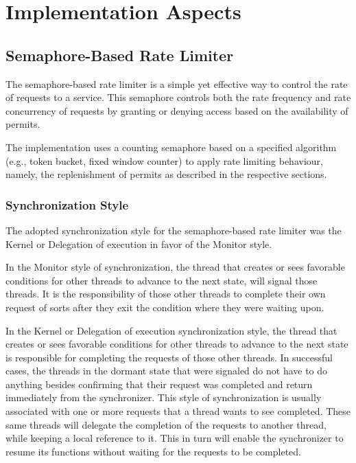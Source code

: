 \section{Implementation Aspects}\label{sec:rate-limiter-implementation}

\subsection{Semaphore-Based Rate Limiter}\label{subsec:rate-limiter-semaphore-based}

The semaphore-based rate limiter is a simple yet effective way to control the rate of requests to a service.
This semaphore controls both the rate frequency and rate concurrency of requests by granting or denying access based on the availability of permits.

The implementation uses a counting semaphore based on a specified algorithm
(e.g., token bucket, fixed window counter) to apply rate limiting behaviour, namely,
the replenishment of permits as described in the respective sections.

\subsubsection{Synchronization Style}\label{subsubsec:rate-limiter-synchronization-style}

The adopted synchronization style for the semaphore-based rate limiter was the Kernel or Delegation of execution in favor of the Monitor style.

In the Monitor style of synchronization, the thread that creates or sees favorable conditions for other threads to advance to the next state, will signal those threads. It is the responsibility of those other threads to complete their own request of sorts after they exit the condition where they were waiting upon.

In the Kernel or Delegation of execution synchronization style,
the thread that creates or sees favorable conditions for other threads to advance to the next state is responsible
for completing the requests of those other threads.
In successful cases,
the threads in the dormant state that were signaled do not have
to do anything besides confirming that their request was completed and return immediately from the synchronizer.
This style of synchronization is usually associated with one or more requests that a thread wants to see completed.
These same threads will delegate the completion of the requests to another thread,
while keeping a local reference to it.
This in turn will enable the synchronizer to resume its functions without waiting for the requests to be completed.

